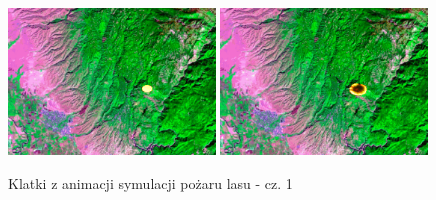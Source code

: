 \documentclass{article}
\begin{document}
    \begin{figure}[!htpb]
        \centering
        \includegraphics[width=0.49\textwidth]{resources/wildfire.overlay.000.png}\hfill
        \includegraphics[width=0.49\textwidth]{resources/wildfire.overlay.007.png}
        \caption{Klatki z animacji symulacji pożaru lasu - cz. 1}
        \label{frames-1}
    \end{figure}
\end{document}

